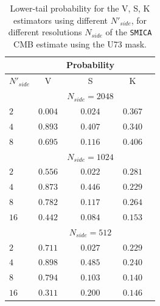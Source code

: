 \begin{table}
\centering
\caption{Lower-tail probability for the V, S, K estimators using different $N'_{side}$, for different resolutions $N_{side}$ of the  \texttt{SMICA} CMB estimate using the U73 mask.}
\label{table:2}
\begin{tabular}{@{}lcccc}
\hline 
  & & Probability & \\
\hline  
$N'_{side}$ & V & S & K \\ 
\hline  
 & & $N_{side}=2048$ & \\
$2$ & $0.004 $ & $ 0.024$ & $0.367 $ \\ 
$4$ & $ 0.893 $ & $ 0.407 $ & $ 0.340 $  \\
$8$ & $ 0.695 $ & $ 0.116 $ & $ 0.406 $  \\
 & & $ N_{side} = 1024 $ & \\
$2$ & $ 0.556 $ & $ 0.022 $ & $ 0.281 $ \\ 
$4$ & $ 0.873 $ & $ 0.446 $ & $ 0.229 $  \\
$8$ & $ 0.782 $ & $ 0.117 $ & $ 0.264 $  \\
$16$ & $ 0.442 $ & $ 0.084 $ & $ 0.153 $  \\
 & & $N_{side} = 512$ & \\
$2$ & $0.711 $ & $ 0.027 $ & $ 0.229 $ \\ 
$4$ & $ 0.898 $ & $ 0.485 $ & $ 0.240 $  \\
$8$ & $ 0.794 $ & $ 0.103 $ & $ 0.140 $  \\
$16$ & $ 0.311 $ & $ 0.200 $ & $ 0.146 $  \\

\end{tabular}
\end{table}

